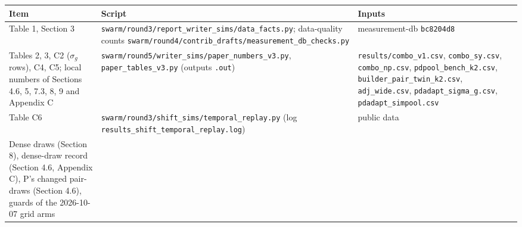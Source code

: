 \documentclass[
]{article}
\begin{document}
\begin{longtable}[]{@{}
  >{\raggedright\arraybackslash}p{}
  >{\raggedright\arraybackslash}p{}
  >{\raggedright\arraybackslash}p{}@{}}
\toprule\noalign{}
\begin{minipage}[b]{\linewidth}\raggedright
Item
\end{minipage} & \begin{minipage}[b]{\linewidth}\raggedright
Script
\end{minipage} & \begin{minipage}[b]{\linewidth}\raggedright
Inputs
\end{minipage} \\
\midrule\noalign{}
\endhead
\bottomrule\noalign{}
\endlastfoot
Table 1, Section 3 &
\texttt{swarm/\allowbreak{}round3/\allowbreak{}report\_\allowbreak{}writer\_\allowbreak{}sims/\allowbreak{}data\_\allowbreak{}facts.\allowbreak{}py};
data-quality counts
\texttt{swarm/\allowbreak{}round4/\allowbreak{}contrib\_\allowbreak{}drafts/\allowbreak{}measurement\_\allowbreak{}db\_\allowbreak{}checks.\allowbreak{}py}
& measurement-db \texttt{bc8204d8} \\
Tables 2, 3, C2 (\(\sigma_g\) rows), C4, C5; local numbers of Sections
4.6, 5, 7.3, 8, 9 and Appendix C &
\texttt{swarm/\allowbreak{}round5/\allowbreak{}writer\_\allowbreak{}sims/\allowbreak{}paper\_\allowbreak{}numbers\_\allowbreak{}v3.\allowbreak{}py},
\texttt{paper\_\allowbreak{}tables\_\allowbreak{}v3.\allowbreak{}py}
(outputs \texttt{.\allowbreak{}out}) &
\texttt{results/\allowbreak{}combo\_\allowbreak{}v1.\allowbreak{}csv},
\texttt{combo\_\allowbreak{}sy.\allowbreak{}csv},
\texttt{combo\_\allowbreak{}np.\allowbreak{}csv},
\texttt{pdpool\_\allowbreak{}bench\_\allowbreak{}k2.\allowbreak{}csv},
\texttt{builder\_\allowbreak{}pair\_\allowbreak{}twin\_\allowbreak{}k2.\allowbreak{}csv},
\texttt{adj\_\allowbreak{}wide.\allowbreak{}csv},
\texttt{pdadapt\_\allowbreak{}sigma\_\allowbreak{}g.\allowbreak{}csv},
\texttt{pdadapt\_\allowbreak{}simpool.\allowbreak{}csv} \\
Table C6 &
\texttt{swarm/\allowbreak{}round3/\allowbreak{}shift\_\allowbreak{}sims/\allowbreak{}temporal\_\allowbreak{}replay.\allowbreak{}py}
(log
\texttt{results\_\allowbreak{}shift\_\allowbreak{}temporal\_\allowbreak{}replay.\allowbreak{}log})
& public data \\
Dense draws (Section 8), dense-draw record (Section 4.6, Appendix C),
P's changed pair-draws (Section 4.6), guards of the 2026-10-07 grid arms

\end{longtable}
\end{document}
